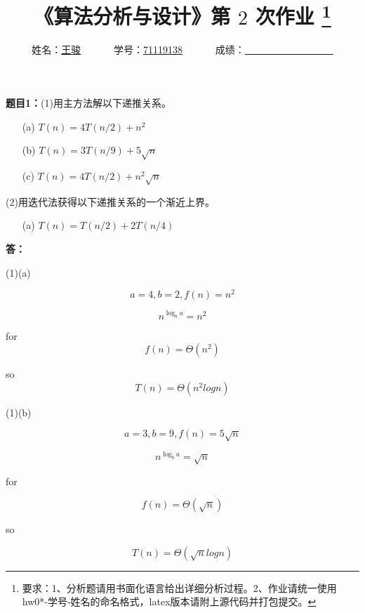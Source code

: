 \documentclass[12pt,a4paper]{article}
\begin{document}
\begin{CJK*}{UTF8}{gbsn}

\title{
  {《算法分析与设计》第 {$2$} 次作业
    \footnote{要求：1、分析题请用书面化语言给出详细分析过程。2、作业请统一使用hw0*-学号-姓名的命名格式，latex版本请附上源代码并打包提交。}
    }
}
\date{}

\author{
姓名：\underline{王骏}~~~~~~
学号：\underline{71119138}~~~~~~
成绩：\underline{~~~~~~~~~~~~~~~~~~}
}

\maketitle

\noindent
\section*{\bf \color{red}{算法分析题}}
\noindent
{\bf 题目1：}(1)用主方法解以下递推关系。
\begin{enumerate}
	\item[(a)]  $T(n)=4T(n/2)+n^2$
	\item[(b)]  $T(n)=3T(n/9)+5\sqrt{n}$
	\item[(c)]  $T(n)=4T(n/2)+n^2\sqrt{n}$
\end{enumerate}
(2)用迭代法获得以下递推关系的一个渐近上界。
\begin{enumerate}
	\item[(a)]  $T(n)=T(n/2)+2T(n/4)$
\end{enumerate}

\vspace{5pt}
\noindent
{\bf 答：}


(1)(a) 

$$ a = 4, b = 2, f(n) = n^2$$

$$ n^{\log_ba} = n^2 $$

for 
$$ f(n) = \Theta(n^2)$$

so
$$ T(n) = \Theta(n^2logn)$$

\vspace{5pt}

(1)(b)

$$ a = 3, b = 9, f(n) = 5\sqrt{n}$$

$$ n^{\log_ba} = \sqrt{n} $$

for 

$$ f(n) = \Theta(\sqrt{n})$$

so

$$ T(n) = \Theta(\sqrt{n}logn)$$

\vspace{5pt}


\end{CJK*}
\end{document}
